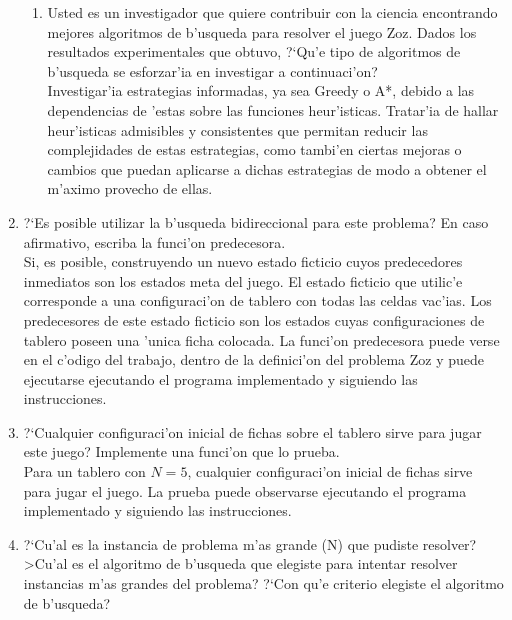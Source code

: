\documentclass[11pt]{article}
\begin{document}
\begin{enumerate}
\begin{enumerate}
	\item Usted es un investigador que quiere contribuir con la ciencia encontrando mejores algoritmos de b'usqueda para resolver el juego Zoz. Dados los resultados experimentales que obtuvo, ?`Qu'e tipo de algoritmos de b'usqueda se 	esforzar'ia en investigar a continuaci'on? \\
	
	Investigar'ia estrategias informadas, ya sea Greedy o A*, debido a las dependencias de 'estas sobre las funciones heur'isticas. Tratar'ia de hallar heur'isticas admisibles y consistentes que permitan reducir las complejidades de estas estrategias, como tambi'en ciertas mejoras o cambios que puedan aplicarse a dichas estrategias de modo a obtener el m'aximo provecho de ellas. \\
	
	\end{enumerate}

\item ?`Es posible utilizar la b'usqueda bidireccional para este problema? En caso afirmativo, escriba la funci'on
predecesora. \\

Si, es posible, construyendo un nuevo estado ficticio cuyos predecedores inmediatos son los estados meta del juego.
El estado ficticio que utilic'e corresponde a una configuraci'on de tablero con todas las celdas vac'ias. Los predecesores de este estado ficticio son los estados cuyas configuraciones de tablero poseen una 'unica ficha colocada.
La funci'on predecesora puede verse en el c'odigo del trabajo, dentro de la definici'on del problema Zoz y puede ejecutarse ejecutando el programa implementado y siguiendo las instrucciones.
	
	 
\item ?`Cualquier configuraci'on inicial de fichas sobre el tablero sirve para jugar este juego? Implemente una
funci'on que lo prueba. \\

Para un tablero con $N=5$, cualquier configuraci'on inicial de fichas sirve para jugar el juego. La prueba puede observarse ejecutando el programa implementado y siguiendo las instrucciones. \\

\item ?`Cu'al es la instancia de problema m'as grande (N) que pudiste resolver? >Cu'al es el algoritmo de
b'usqueda que elegiste para intentar resolver instancias m'as grandes del problema? ?`Con qu'e criterio
elegiste el algoritmo de b'usqueda? \\ 


\end{enumerate}
\end{document}
